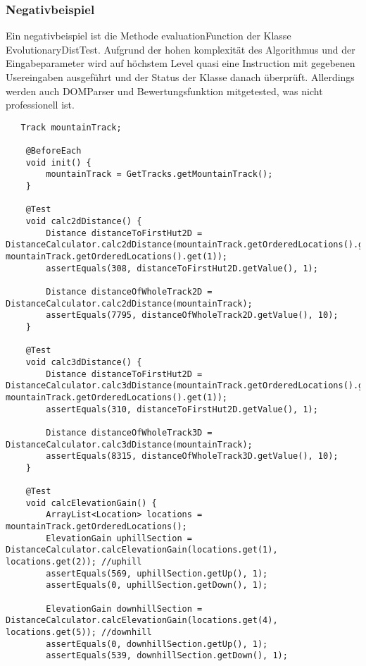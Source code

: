 \subsubsection{Negativbeispiel}

Ein negativbeispiel ist die Methode evaluationFunction der Klasse EvolutionaryDistTest. Aufgrund der hohen komplexität des Algorithmus und der Eingabeparameter wird auf höchstem Level quasi eine Instruction mit gegebenen Usereingaben ausgeführt und der Status der Klasse danach überprüft. Allerdings werden auch DOMParser und Bewertungsfunktion mitgetested, was nicht professionell ist.

\begin{lstlisting}
   Track mountainTrack;

    @BeforeEach
    void init() {
        mountainTrack = GetTracks.getMountainTrack();
    }

    @Test
    void calc2dDistance() {
        Distance distanceToFirstHut2D = DistanceCalculator.calc2dDistance(mountainTrack.getOrderedLocations().get(0), mountainTrack.getOrderedLocations().get(1));
        assertEquals(308, distanceToFirstHut2D.getValue(), 1);

        Distance distanceOfWholeTrack2D = DistanceCalculator.calc2dDistance(mountainTrack);
        assertEquals(7795, distanceOfWholeTrack2D.getValue(), 10);
    }

    @Test
    void calc3dDistance() {
        Distance distanceToFirstHut2D = DistanceCalculator.calc3dDistance(mountainTrack.getOrderedLocations().get(0), mountainTrack.getOrderedLocations().get(1));
        assertEquals(310, distanceToFirstHut2D.getValue(), 1);

        Distance distanceOfWholeTrack3D = DistanceCalculator.calc3dDistance(mountainTrack);
        assertEquals(8315, distanceOfWholeTrack3D.getValue(), 10);
    }

    @Test
    void calcElevationGain() {
        ArrayList<Location> locations = mountainTrack.getOrderedLocations();
        ElevationGain uphillSection = DistanceCalculator.calcElevationGain(locations.get(1), locations.get(2)); //uphill
        assertEquals(569, uphillSection.getUp(), 1);
        assertEquals(0, uphillSection.getDown(), 1);

        ElevationGain downhillSection = DistanceCalculator.calcElevationGain(locations.get(4), locations.get(5)); //downhill
        assertEquals(0, downhillSection.getUp(), 1);
        assertEquals(539, downhillSection.getDown(), 1);


\end{lstlisting}
